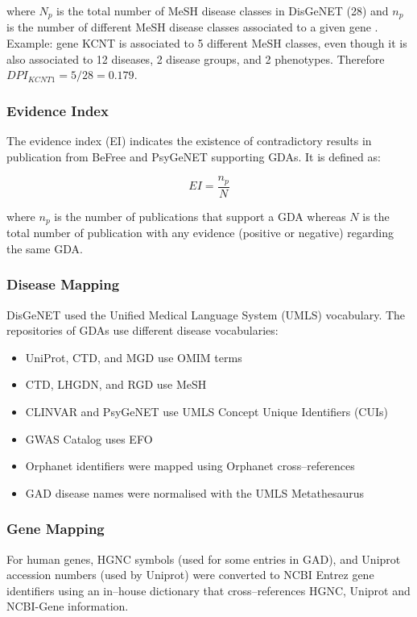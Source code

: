 where $N_p$ is the total number of MeSH disease classes in DisGeNET (28) and $n_p$ is the number of different MeSH disease classes associated to a given gene \cite{DisGeNET2015}. Example: gene KCNT is associated to 5 different MeSH classes, even though it is also associated to 12 diseases, 2 disease groups, and 2 phenotypes. Therefore $DPI_{KCNT1} = 5/28 = 0.179$.

\subsubsection{Evidence Index}
The evidence index (EI) indicates the existence of contradictory results in publication from BeFree and PsyGeNET supporting GDAs. It is defined as:

$$EI = \frac{n_p}{N}$$

where $n_p$ is the number of publications that support a GDA whereas $N$ is the total number of publication with any evidence (positive or negative) regarding the same GDA.

\subsubsection{Disease Mapping}
DisGeNET used the Unified Medical Language System (UMLS) vocabulary. The repositories of GDAs use different disease vocabularies:
\begin{itemize}
    \item UniProt, CTD, and MGD use OMIM terms
    \item CTD, LHGDN, and RGD use MeSH
    \item CLINVAR and PsyGeNET use UMLS Concept Unique Identifiers (CUIs)
    \item GWAS Catalog uses EFO
    \item Orphanet identifiers were mapped using Orphanet cross--references
    \item GAD disease names were normalised with the UMLS Metathesaurus
\end{itemize}

\subsubsection{Gene Mapping}
For human genes, HGNC symbols (used for some entries in GAD), and Uniprot accession numbers (used by Uniprot) were converted to NCBI Entrez gene identifiers using an in--house dictionary that cross--references HGNC, Uniprot and NCBI-Gene information.

